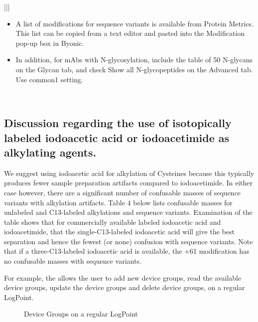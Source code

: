 \documentclass[letterpaper,10pt,oneside,english]{sphinxmanual}
\begin{document}
\begin{savenotes}
\begin{tabular}[t]{|||}
\begin{itemize}
\item {} 
A list of modifications for sequence variants is available from Protein Metrics.  This list can be copied from a text editor and pasted into the Modification pop-up box in Byonic.

\item {} 
In addition, for mAbs with N-glycosylation, include the table of 50 N-glycans on the Glycan tab, and check Show all N-glycopeptides on the Advanced tab. Use common1 setting.

\end{itemize}
\\
\hline
\end{tabular}
\par
\sphinxattableend\end{savenotes}


\subsection{Discussion regarding the use of isotopically labeled iodoacetic acid or iodoacetimide as alkylating agents.}
\label{\detokenize{applicationnote:discussion-regarding-the-use-of-isotopically-labeled-iodoacetic-acid-or-iodoacetimide-as-alkylating-agents}}
We suggest using iodoacetic acid for alkylation of Cysteines because this typically produces fewer sample preparation artifacts compared to iodoacetimide.  In either case however, there are a significant number of confusable masses of sequence variants with alkylation artifacts.  Table 4 below lists confusable masses for unlabeled and C13-labeled alkylations and sequence variants.  Examination of the table shows that for commercially available labeled iodoacetic acid and iodoacetimide, that the single-C13-labeled iodoacetic acid will give the best separation and hence the fewest (or none) confusion with sequence variants.  Note that if a three-C13-labeled iodoacetic acid is available, the +61 modification has no confusable masses with sequence variants.

For example, the   allows the user to add new device groups, read the available device groups, update the device groups and delete device groups, on a regular LogPoint.

\begin{figure}[H]
\centering
\capstart

\noindent{}
\caption{Device Groups on a regular LogPoint}\label{\detokenize{applicationnote:id2}}\end{figure}
\end{document}
